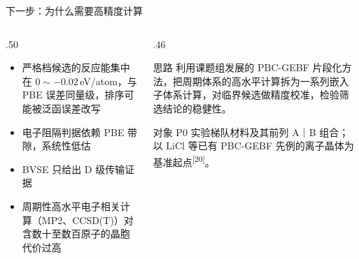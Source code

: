 \documentclass[aspectratio=169,10pt]{beamer}
\renewcommand{\cite}[1]{\textsuperscript{\color{NJUMuted}[#1]}}
\begin{document}
\begin{frame}[t]{下一步：为什么需要高精度计算}
\begin{columns}[T,onlytextwidth]
  \begin{column}{.50\textwidth}
    \begin{itemize}
      \item 严格档候选的反应能集中在 $0\sim-0.02$\,eV/atom，\alert{与 PBE 误差同量级}，排序可能被泛函误差改写
      \item 电子阻隔判据依赖 PBE 带隙，系统性低估
      \item BVSE 只给出 D 级传输证据
      \item 周期性高水平电子相关计算（MP2、CCSD(T)）对含数十至数百原子的晶胞代价过高
    \end{itemize}
  \end{column}
  \begin{column}{.46\textwidth}
    \begin{njuquote}{思路}
      利用课题组发展的 \alert{PBC-GEBF} 片段化方法，把周期体系的高水平计算拆为一系列嵌入子体系计算，对临界候选做\alert{精度校准}，检验筛选结论的稳健性。
    \end{njuquote}
    \begin{njuquoteblue}{对象}
      P0 实验梯队材料及其前列 A｜B 组合；以 LiCl 等已有 PBC-GEBF 先例的离子晶体为基准起点\cite{20}。
    \end{njuquoteblue}
  \end{column}
\end{columns}
\end{frame}
\end{document}
